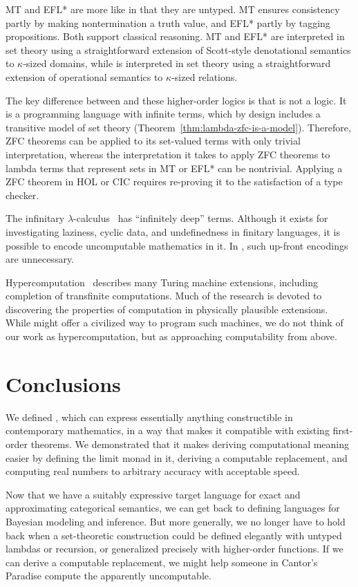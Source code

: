MT and EFL* are more like \targetlang in that they are untyped. MT ensures consistency partly by making nontermination a truth value, and EFL* partly by tagging propositions.
Both support classical reasoning.
MT and EFL* are interpreted in set theory using a straightforward extension of Scott-style denotational semantics to $\kappa$-sized domains, while \targetlang is interpreted in set theory using a straightforward extension of operational semantics to $\kappa$-sized relations.

The key difference between \targetlang and these higher-order logics is that \targetlang is not a logic. It is a programming language with infinite terms, which by design includes a transitive model of set theory (Theorem~\ref{thm:lambda-zfc-is-a-model}). Therefore, ZFC theorems can be applied to its set-valued terms with only trivial interpretation, whereas the interpretation it takes to apply ZFC theorems to lambda terms that represent sets in MT or EFL* can be nontrivial. Applying a ZFC theorem in HOL or CIC requires re-proving it to the satisfaction of a type checker.

The infinitary $\lambda$-calculus~\cite{cit:kennaway-1996-inf-lc} has ``infinitely deep'' terms. Although it exists for investigating laziness, cyclic data, and undefinedness in finitary languages, it is possible to encode uncomputable mathematics in it. In \targetlang, such up-front encodings are unnecessary.

Hypercomputation~\cite{cit:ord-2006-hypercomp} describes many Turing machine extensions, including completion of transfinite computations. Much of the research is devoted to discovering the properties of computation in physically plausible extensions. While \targetlang might offer a civilized way to program such machines, we do not think of our work as hypercomputation, but as approaching computability from above.


\section{Conclusions}

We defined \targetlang, which can express essentially anything constructible in contemporary mathematics, in a way that makes it compatible with existing first-order theorems. We demonstrated that it makes deriving computational meaning easier by defining the limit monad in it, deriving a computable replacement, and computing real numbers to arbitrary accuracy with acceptable speed.

Now that we have a suitably expressive target language for exact and approximating categorical semantics, we can get back to defining languages for Bayesian modeling and inference. But more generally, we no longer have to hold back when a set-theoretic construction could be defined elegantly with untyped lambdas or recursion, or generalized precisely with higher-order functions. If we can derive a computable replacement, we might help someone in Cantor's Paradise compute the apparently uncomputable.

